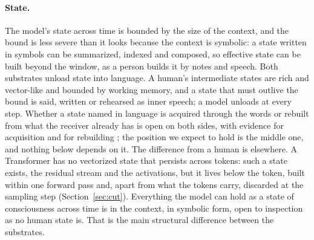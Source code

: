 \paragraph{State.}
The model's state across time is bounded by the size of the context, and the bound is less severe than
it looks because the context is symbolic: a state written in symbols can be summarized, indexed and
composed, so effective state can be built beyond the window, as a person builds it by notes and
speech. Both substrates unload state into language. A human's intermediate states are rich and
vector-like and bounded by working memory, and a state that must outlive the bound is said, written or
rehearsed as inner speech; a model unloads at every step. Whether a state named in language is acquired
through the words or rebuilt from what the receiver already has is open on both sides, with evidence
for acquisition \citep{vygotsky1934,clark1998,lupyan2012,frank2008} and for rebuilding
\citep{barsalou1999,fedorenko2024,mahowald2024}; the position we expect to hold is the middle one, and
nothing below depends on it. The difference from a human is elsewhere. A Transformer has no vectorized
state that persists across tokens: such a state exists, the residual stream and the activations, but
it lives below the token, built within one forward pass and, apart from what the tokens carry,
discarded at the sampling step (Section~\ref{sec:cut}). Everything the model can hold as a state of
consciousness across time is in the context, in symbolic form, open to inspection as no human state
is. That is the main structural difference between the substrates.

